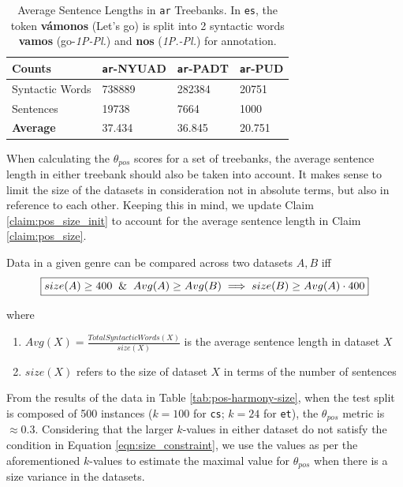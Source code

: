 \begin{table}[H]
    \centering
    \begin{tabular}{|l|l|l|l|}
    \hline
    \textbf{Counts} & \texttt{ar}-NYUAD & \texttt{ar}-PADT & \texttt{ar}-PUD \\
    \hline
    Syntactic Words & 738889 & 282384 & 20751 \\
    Sentences & 19738 & 7664 & 1000\\
    \hline
    \textbf{Average} & 37.434 & 36.845 & 20.751\\
    \hline
    \end{tabular}
    \caption[Average Sentence Lengths in \texttt{ar} Treebanks]{Average Sentence Lengths in \texttt{ar} Treebanks. In \texttt{es}, the token \textbf{v\'amonos} (Let's go) is split into 2 syntactic words \textbf{vamos} (go-\textit{1P-Pl.}) and \textbf{nos} (\textit{1P.-Pl.}) for annotation.}
    \label{tab:counts-ar}
\end{table}

When calculating the $\theta_{pos}$ scores for a set of treebanks, the average sentence length in either treebank should also be taken into account. It makes sense to limit the size of the datasets in consideration not in absolute terms, but also in reference to each other. Keeping this in mind, we update Claim \ref{claim:pos_size_init} to account for the average sentence length in Claim \ref{claim:pos_size}.

\begin{claim}
Data in a given genre can be compared across two datasets $A, B$ iff \\
\begin{equation}
\label{eqn:size_constraint}
    \boxed{size(A) \geq 400 \And Avg(A) \geq Avg(B) \implies size(B) \geq Avg(A) \cdot 400}
\end{equation}
\label{claim:pos_size}
\end{claim}

where 
\begin{enumerate}
    \item $Avg(X) = \frac{Total Syntactic Words(X)}{size(X)}$ is the average sentence length in dataset $X$
    \item $size(X)$ refers to the size of dataset $X$ in terms of the number of sentences
\end{enumerate}

From the results of the data in Table \ref{tab:pos-harmony-size}, when the test split is composed of 500 instances ($k=100$ for \texttt{cs}; $k=24$ for \texttt{et}), the $\theta_{pos}$ metric is $\approx 0.3$. Considering that the larger $k$-values in either dataset do not satisfy the condition in Equation \ref{eqn:size_constraint}, we use the values as per the aforementioned $k$-values to estimate the maximal value for $\theta_{pos}$ when there is a size variance in the datasets.

